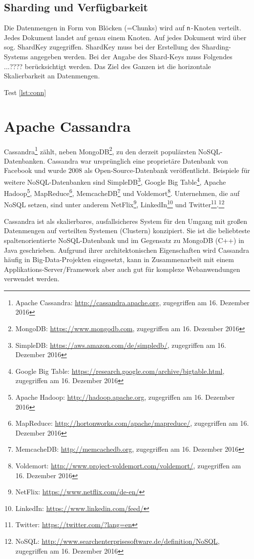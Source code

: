 \subsection{Sharding und Verfügbarkeit}
Die Datenmengen in Form von Blöcken (=Chunks) wird auf \texttt{n-}Knoten verteilt. Jedes Dokument landet auf genau einem Knoten. Auf jedes Dokument wird über sog. ShardKey zugegriffen. ShardKey muss bei der Erstellung des Sharding-Systems angegeben werden. Bei der Angabe des Shard-Keys muss Folgendes ...???? berücksichtigt werden. Das Ziel des Ganzen ist die horizontale Skalierbarkeit an Datenmengen.



Test \ref{lst:conn}
\section{Apache Cassandra}
Cassandra\footnote{Apache Cassandra: \url{http://cassandra.apache.org}, zugegriffen am 16. Dezember 2016} zählt, neben MongoDB\footnote{MongoDB: \url{https://www.mongodb.com}, zugegriffen am 16. Dezember 2016}, zu den derzeit populärsten NoSQL-Datenbanken. Cassandra war ursprünglich eine proprietäre Datenbank von Facebook und wurde 2008 als Open-Source-Datenbank veröffentlicht. Beispiele für weitere NoSQL-Datenbanken sind SimpleDB\footnote{SimpleDB: \url{https://aws.amazon.com/de/simpledb/}, zugegriffen am 16. Dezember 2016}, Google Big Table\footnote{Google Big Table: \url{https://research.google.com/archive/bigtable.html}, zugegriffen am 16. Dezember 2016}, Apache Hadoop\footnote{Apache Hadoop: \url{http://hadoop.apache.org}, zugegriffen am 16. Dezember 2016}, MapReduce\footnote{MapReduce: \url{http://hortonworks.com/apache/mapreduce/}, zugegriffen am 16. Dezember 2016}, MemcacheDB\footnote{MemcacheDB: \url{http://memcachedb.org}, zugegriffen am 16. Dezember 2016} und Voldemort\footnote{Voldemort: \url{http://www.project-voldemort.com/voldemort/}, zugegriffen am 16. Dezember 2016}. Unternehmen, die auf NoSQL setzen, sind unter anderem NetFlix\footnote{NetFlix: \url{https://www.netflix.com/de-en/}}, LinkedIn\footnote{LinkedIn: \url{https://www.linkedin.com/feed/}} und Twitter\footnote{Twitter: \url{https://twitter.com/?lang=en}}.\footnote{NoSQL: \url{http://www.searchenterprisesoftware.de/definition/NoSQL}, zugegriffen am 16. Dezember 2016}\newline

Cassandra ist als skalierbares, ausfallsicheres System für den Umgang mit großen Datenmengen auf verteilten Systemen (Clustern) konzipiert. Sie ist die beliebteste spaltenorientierte NoSQL-Datenbank und im Gegensatz zu MongoDB (C++) in Java geschrieben. Aufgrund ihrer architektonischen Eigenschaften wird Cassandra häufig in Big-Data-Projekten eingesetzt, kann in Zusammenarbeit mit einem Applikations-Server/Framework aber auch gut für komplexe Webanwendungen verwendet werden.
